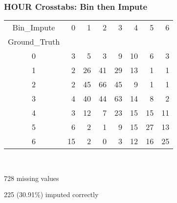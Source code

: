 \begin{frame}[t]
	\frametitle{HOUR Crosstabs:  Bin then Impute}
	\Large


\begin{tabular}{crrrrrrr}
Bin\_Impute &   0 &   1 &   2 &   3 &   4 &   5 &   6 \\
Ground\_Truth &     &     &     &     &     &     &     \\
\hline
0              &   3 &   5 &   3 &   9 &  10 &   6 &   3 \\
1              &   2 &  26 &  41 &  29 &  13 &   1 &   1 \\
2              &   2 &  45 &  66 &  45 &   9 &   1 &   1 \\
3              &   4 &  40 &  44 &  63 &  14 &   8 &   2 \\
4              &   3 &  12 &   7 &  23 &  15 &  15 &  11 \\
5              &   6 &   2 &   1 &   9 &  15 &  27 &  13 \\
6              &  15 &   2 &   0 &   3 &  12 &  16 &  25 \\
\end{tabular}

\

728 missing values

 225 (30.91\%) imputed correctly


\end{frame}






